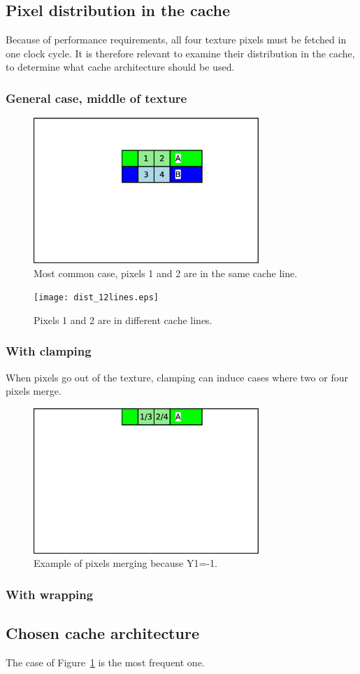 \documentclass[a4paper,11pt]{article}
\begin{document}
\subsection{Pixel distribution in the cache}
Because of performance requirements, all four texture pixels must be fetched in one clock cycle. It is therefore relevant to examine their distribution in the cache, to determine what cache architecture should be used.

\subsubsection{General case, middle of texture}
\begin{figure}[H]
\centering
\includegraphics[height=55mm]{dist_common.eps}
\caption{Most common case, pixels 1 and 2 are in the same cache line.}\label{fig:case1}
\end{figure}

\begin{figure}[H]
\centering
\texttt{[image: dist\_12lines.eps]}
\caption{Pixels 1 and 2 are in different cache lines.}\label{fig:case2}
\end{figure}

\subsubsection{With clamping}
When pixels go out of the texture, clamping can induce cases where two or four pixels merge.

\begin{figure}[H]
\centering
\includegraphics[height=55mm]{dist_clamp.eps}
\caption{Example of pixels merging because Y1=-1.}\label{fig:caseclamp}
\end{figure}

\subsubsection{With wrapping}

\subsection{Chosen cache architecture}
The case of Figure~\ref{fig:case1} is the most frequent one.
\end{document}
